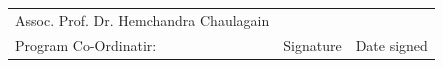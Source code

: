 \begin{titlepage}
{\begin{tabular}{@{}p{6.5cm} p{4.5cm} p{4cm}@{}}
        Assoc. Prof. Dr. Hemchandra Chaulagain & \underline{\hspace{4cm}} & \underline{\hspace{3.5cm}} \\
        Program Co-Ordinatir: & Signature & Date signed \\
    \end{tabular}
    }

\end{titlepage}
